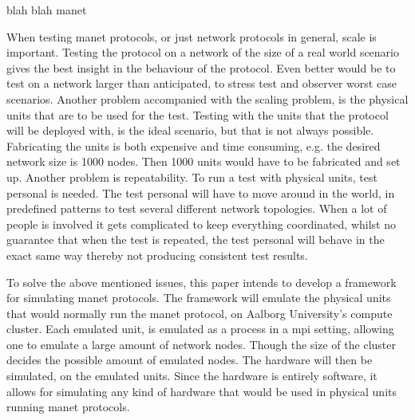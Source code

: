 




blah blah \gls{manet}\medbreak



When testing \gls{manet} protocols, or just network protocols in general, scale is important. Testing the protocol on a network of the size of a real world scenario gives the best insight in the behaviour of the protocol. Even better would be to test on a network larger than anticipated, to stress test and observer worst case scenarios.
Another problem accompanied with the scaling problem, is the physical units that are to be used for the test. Testing with the units that the protocol will be deployed with, is the ideal scenario, but that is not always possible. Fabricating the units is both expensive and time consuming, e.g. the desired network size is 1000 nodes. Then 1000 units would have to be fabricated and set up.
Another problem is repeatability. To run a test with physical units, test personal is needed. The test personal will have to move around in the world, in predefined patterns to test several different network topologies. When a lot of people is involved it gets complicated to keep everything coordinated, whilst no guarantee that when the test is repeated, the test personal will behave in the exact same way thereby not producing consistent test results.\medbreak

To solve the above mentioned issues, this paper intends to develop a framework for simulating \gls{manet} protocols. The framework will emulate the physical units that would normally run the \gls{manet} protocol, on Aalborg University's compute cluster. Each emulated unit, is emulated as a process in a \gls{mpi} setting, allowing one to emulate a large amount of network nodes. Though the size of the cluster decides the possible amount of emulated nodes. The hardware will then be simulated, on the emulated units. Since the hardware is entirely software, it allows for simulating any kind of hardware that would be used in physical units running \gls{manet} protocols.\medbreak


